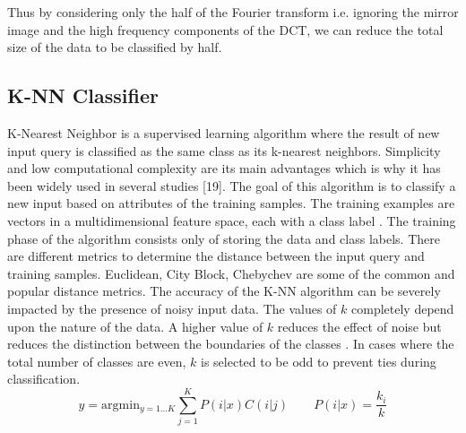 \documentclass[conference]{IEEEtran}
\begin{document}

Thus by considering only the half of the Fourier transform i.e. ignoring the mirror image and the high frequency components of the DCT, we can reduce the total size of the data to be classified by half.

\subsection{K-NN Classifier}

K-Nearest Neighbor is a supervised learning algorithm where the result of new input query is classified as the same class as its k-nearest neighbors. Simplicity and low computational complexity are its main advantages which is why it has been widely used in several studies \cite{17}\cite{18}[19]. The goal of this algorithm is to classify a new input based on attributes of the training samples. The training examples are vectors in a multidimensional feature space, each with a class label \cite{18}. The training phase of the algorithm consists only of storing the data and class labels. There are different metrics to determine the distance between the input query and training samples. Euclidean, City Block, Chebychev are some of the common and popular distance metrics. The accuracy of the K-NN algorithm can be severely impacted by the presence of noisy input data. The values of $k$ completely depend upon the nature of the data. A higher value of $k$ reduces the effect of noise but reduces the distinction between the boundaries of the classes \cite{18}. In cases where the total number of classes are even, $k$ is selected to be odd to prevent ties during classification. 
\begin{equation}
	y = \mathrm{arg} \mathrm{min}_{y = 1 \ldots K} \sum^K_{j=1} P(i|x)C(i|j)\qquad P(i|x) = \frac{k_i}{k}
\end{equation}
\end{document}
